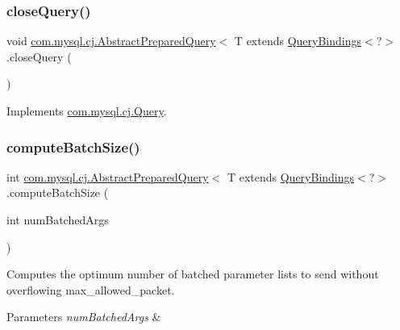 \subsubsection{\texorpdfstring{close\+Query()}{closeQuery()}}
{\footnotesize\ttfamily void \mbox{\hyperlink{classcom_1_1mysql_1_1cj_1_1_abstract_prepared_query}{com.\+mysql.\+cj.\+Abstract\+Prepared\+Query}}$<$ T extends \mbox{\hyperlink{interfacecom_1_1mysql_1_1cj_1_1_query_bindings}{Query\+Bindings}}$<$?$>$.close\+Query (\begin{DoxyParamCaption}{ }\end{DoxyParamCaption})}



Implements \mbox{\hyperlink{interfacecom_1_1mysql_1_1cj_1_1_query_a5808add7bd2bffa44c7532995b16e442}{com.\+mysql.\+cj.\+Query}}.

\mbox{\label{classcom_1_1mysql_1_1cj_1_1_abstract_prepared_query_abaf5a9940a4785f96991f7f6b4d3549c}} 
\subsubsection{\texorpdfstring{compute\+Batch\+Size()}{computeBatchSize()}}
{\footnotesize\ttfamily int \mbox{\hyperlink{classcom_1_1mysql_1_1cj_1_1_abstract_prepared_query}{com.\+mysql.\+cj.\+Abstract\+Prepared\+Query}}$<$ T extends \mbox{\hyperlink{interfacecom_1_1mysql_1_1cj_1_1_query_bindings}{Query\+Bindings}}$<$?$>$.compute\+Batch\+Size (\begin{DoxyParamCaption}\item[{int}]{num\+Batched\+Args }\end{DoxyParamCaption})}

Computes the optimum number of batched parameter lists to send without overflowing max\+\_\+allowed\+\_\+packet.


\begin{DoxyParams}{Parameters}
{\em num\+Batched\+Args} & \\
\hline
\end{DoxyParams}
\mbox{\label{classcom_1_1mysql_1_1cj_1_1_abstract_prepared_query_a29bac70aa2edad992b03494e5f7f97ef}} 

